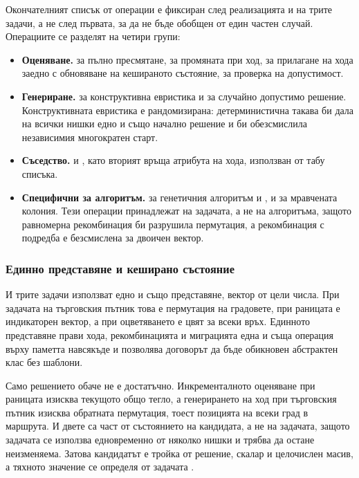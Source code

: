 Окончателният списък от операции е фиксиран след реализацията и на трите задачи, а не
след първата, за да не бъде обобщен от един частен случай. Операциите се разделят на
четири групи:

\begin{itemize}[topsep=0pt,itemsep=2pt,leftmargin=*]
\item \textbf{Оценяване.}  за пълно пресмятане,  за
      промяната при ход,  за прилагане на хода заедно с обновяване на
      кешираното състояние,  за проверка на допустимост.
\item \textbf{Генериране.}  за конструктивна евристика и
       за случайно допустимо решение. Конструктивната евристика
      е рандомизирана: детерминистична такава би дала на всички нишки едно и също
      начално решение и би обезсмислила независимия многократен старт.
\item \textbf{Съседство.}  и , като вторият връща
      атрибута на хода, използван от табу списъка.
\item \textbf{Специфични за алгоритъм.}  за генетичния алгоритъм и
      ,  и  за мравчената
      колония. Тези операции принадлежат на задачата, а не на алгоритъма, защото
      равномерна рекомбинация би разрушила пермутация, а рекомбинация с подредба е
      безсмислена за двоичен вектор.
\end{itemize}

\subsubsection{Единно представяне и кеширано състояние}
\label{subsubsec:design-representation}

И трите задачи използват едно и също представяне, вектор от цели числа. При задачата
на търговския пътник това е пермутация на градовете, при раницата е индикаторен
вектор, а при оцветяването е цвят за всеки връх. Единното представяне прави хода,
рекомбинацията и миграцията една и съща операция върху паметта навсякъде и позволява
договорът да бъде обикновен абстрактен клас без шаблони.

Само решението обаче не е достатъчно. Инкременталното оценяване при раницата изисква
текущото общо тегло, а генерирането на ход при търговския пътник изисква обратната
пермутация, тоест позицията на всеки град в маршрута. И двете са част от състоянието
на кандидата, а не на задачата, защото задачата се използва едновременно от няколко
нишки и трябва да остане неизменяема. Затова кандидатът е тройка от решение, скалар и
целочислен масив, а тяхното значение се определя от задачата
.

